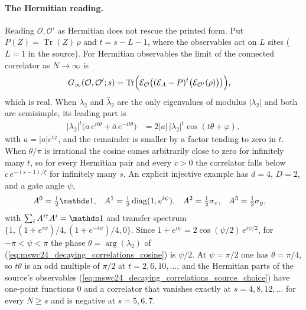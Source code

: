 \documentclass{article}
\begin{document}
\paragraph{The Hermitian reading.}
Reading $\mathcal O,\mathcal O'$ as Hermitian does not rescue the printed
form. Put $P(Z)=\operatorname{Tr}(Z)\,\rho$ and $t=s-L-1$, where the
observables act on $L$ sites ($L=1$ in the source). For Hermitian observables
the limit of the connected correlator as $N\to\infty$ is
\begin{align}
    G_\infty(\mathcal O,\mathcal O';s)
     & =\operatorname{Tr}\Bigl(\mathcal E_{\mathcal O}
    \bigl((\mathcal E_A-P)^{t}\bigl(\mathcal E_{\mathcal O'}(\rho)\bigr)\bigr)\Bigr),
    \label{eq:mswc24_decaying_correlations_limit}
\end{align}
which is real. When $\lambda_2$ and $\bar\lambda_2$ are the only eigenvalues
of modulus $\lvert\lambda_2\rvert$ and both are semisimple, its leading part
is
\begin{align}
    \lvert\lambda_2\rvert^{t}\bigl(a\,e^{it\theta}+\bar a\,e^{-it\theta}\bigr)
     & =2\lvert a\rvert\,\lvert\lambda_2\rvert^{t}\cos(t\theta+\varphi),
    \label{eq:mswc24_decaying_correlations_cosine}
\end{align}
with $a=\lvert a\rvert e^{i\varphi}$, and the remainder is smaller by a factor
tending to zero in $t$. When $\theta/\pi$ is irrational the cosine comes
arbitrarily close to zero for infinitely many $t$, so for every Hermitian pair
and every $c>0$ the correlator falls below $c\,e^{-(s-1)/\xi}$ for infinitely
many $s$. An explicit injective example has $d=4$, $D=2$, and a gate
angle $\psi$,
\begin{align}
    A^0
     & =\tfrac12\one,
     &
    A^1
     & =\tfrac12\operatorname{diag}(1,e^{i\psi}),
     &
    A^2
     & =\tfrac12\sigma_x,
     &
    A^3
     & =\tfrac12\sigma_y,
    \label{eq:mswc24_decaying_correlations_example}
\end{align}
with $\sum_iA^{i\dagger}A^i=\one$ and transfer spectrum
$\{1,(1+e^{i\psi})/4,(1+e^{-i\psi})/4,0\}$. Since
$1+e^{i\psi}=2\cos(\psi/2)\,e^{i\psi/2}$, for $-\pi<\psi<\pi$ the phase
$\theta=\arg(\lambda_2)$ of (\ref{eq:mswc24_decaying_correlations_cosine}) is
$\psi/2$. At
$\psi=\pi/2$ one has $\theta=\pi/4$, so $t\theta$ is an odd multiple of
$\pi/2$ at $t=2,6,10,\dots$, and the
Hermitian parts of the source's observables
(\ref{eq:mswc24_decaying_correlations_source_choice}) have one-point functions
$0$ and a correlator that vanishes exactly at $s=4,8,12,\dots$ for every $N\ge s$
and is negative at $s=5,6,7$.
\end{document}
